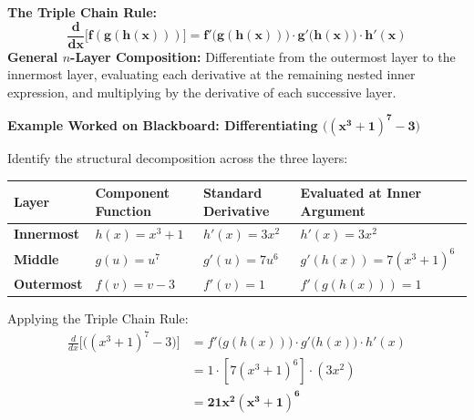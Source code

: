 \documentclass[10.5pt]{article}
\begin{document}
\begin{tcolorbox}[colback=boxbg, colframe=boxframe, boxrule=0.8pt, arc=3pt, left=8pt, right=8pt, top=4pt, bottom=4pt]
\textbf{The Triple Chain Rule:}
\[
  \mathbf{\frac{d}{dx}\big[f(g(h(x)))\big] = f'\big(g(h(x))\big) \cdot g'\big(h(x)\big) \cdot h'(x)}
\]
\textbf{General $n$-Layer Composition:} Differentiate from the outermost layer to the innermost layer, evaluating each derivative at the remaining nested inner expression, and multiplying by the derivative of each successive layer.
\end{tcolorbox}

\vspace{0.03in}

\textbf{Example Worked on Blackboard: Differentiating $\mathbf{\big((x^3 + 1)^7 - 3\big)}$}

Identify the structural decomposition across the three layers:
\begin{center}
\renewcommand{\arraystretch}{1.3}
\begin{tabular}{|l|l|l|l|}
\hline
\textbf{Layer} & \textbf{Component Function} & \textbf{Standard Derivative} & \textbf{Evaluated at Inner Argument} \\ \hline
\textbf{Innermost} & $h(x) = x^3 + 1$ & $h'(x) = 3x^2$ & $h'(x) = 3x^2$ \\ \hline
\textbf{Middle} & $g(u) = u^7$ & $g'(u) = 7u^6$ & $g'(h(x)) = 7(x^3 + 1)^6$ \\ \hline
\textbf{Outermost} & $f(v) = v - 3$ & $f'(v) = 1$ & $f'(g(h(x))) = 1$ \\ \hline
\end{tabular}
\end{center}

\vspace{0.02in}

Applying the Triple Chain Rule:
\begin{align*}
  \frac{d}{dx}\Big[\big((x^3 + 1)^7 - 3\big)\Big] &= f'\big(g(h(x))\big) \cdot g'\big(h(x)\big) \cdot h'(x) \\
  &= 1 \cdot \left[7(x^3 + 1)^6\right] \cdot \left(3x^2\right) \\
  &= \mathbf{21x^2 (x^3 + 1)^6}
\end{align*}
\end{document}
